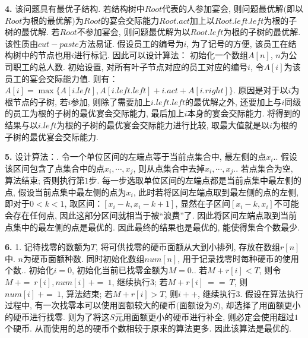 \documentclass{article}
\begin{document}
	\begin{solution}\textnormal{\textbf{4.}}
		该问题具有最优子结构. 若结构树中$Root$代表的人参加宴会, 则问题最优解$($即以$Root$为根的最优解$)$为$Root$的宴会交际能力$Root.act$加上以$Root.left.left$为根的子树的最优解.
		若$Root$不参加宴会, 则问题最优解为以$Root.left$为根的子树的最优解. 该性质由$cut-paste$方法易证.\newline
		假设员工的编号为$i$, 为了记号的方便, 该员工在结构树中的节点也用$i$进行标记. 因此可以设计算法：\newline
		初始化一个数组$A[n]$, $n$为公司职工的总人数. 初始设置, 对所有叶子节点对应的员工对应的编号$i$, 令$A[i]$为该员工的宴会交际能力值.\newline
		则有：$A[i] = \max\{A[i.left], A[i.left.left] + i.act + A[i.right]\}$.\newline
		原因是对于以$i$为根节点的子树, 若$i$参加, 则除了需要加上$i.left.left$的最优解之外, 还要加上与$i$同级的员工为根的子树的最优宴会交际能力, 最后加上$i$本身的宴会交际能力.
		将得到的结果与以$i.left$为根的子树的最优宴会交际能力进行比较, 取最大值就是以$i$为根的子树的最优宴会交际能力.
	\end{solution}
	\begin{solution}\textnormal{\textbf{5.}}
		设计算法：. 令一个单位区间的左端点等于当前点集合中, 最左侧的点$x_i$.. 假设该区间包含了点集合中的点$x_i, \cdots, x_j$, 则从点集合中去掉$x_i, \cdots, x_j$.. 若点集合为空, 算法结束; 否则执行第$1$步.\newline
		每一步选取单位区间的左端点都是当前点集中最左侧的点, 假设当前点集中最左侧的点为$x_i$, 此时若将区间左端点取到最左侧的点的左侧,
		即对于$0 < k < 1$, 取区间：$[x_i - k, x_i - k + 1]$, 显然在子区间$[x_i - k, x_i]$不可能会存在任何点, 因此这部分区间就相当于被“浪费”了.
		因此将区间左端点取到当前点集中的最左侧的点是最优的. 因此最终的结果也是最优的, 能使得集合个数最少.
	\end{solution}
	\begin{solution}\textnormal{\textbf{6.}}
		1. 记待找零的数额为$T$, 将可供找零的硬币面额从大到小排列, 存放在数组$r[n]$中. $n$为硬币面额种数.
		同时初始化数组$num[n]$, 用于记录找零时每种硬币的使用个数.. 初始化$i = 0$, 初始化当前已找零金额为$M = 0$.. 若$M + r[i] < T$, 则令$M\ +=\ r[i], num[i]\ +=\ 1$, 继续执行$3$;
		若$M + r[i]\ ==\ T$, 则$num[i]\ +=\ 1$, 算法结束;
		若$M + r[i] > T$, 则$i++$, 继续执行$3$.
		假设在算法执行过程中, 有一次找零本可以使用面额较大的硬币$($面额设为$S$$)$, 却选择了用面额更小的硬币进行找零.
		则为了将这$S$元用面额更小的硬币进行补全, 则必定会使用超过$1$个硬币. 从而使用的总的硬币个数相较于原来的算法更多. 因此该算法是最优的.
	\end{solution}
\end{document}
